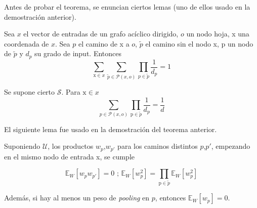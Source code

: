 Antes de probar el teorema, se enuncian ciertos lemas (uno de ellos usado en la demostración anterior).

\begin{lema} \label{lem26}
Sea $x$ el vector de entradas de un grafo acíclico dirigido, $o$ un nodo hoja, x una coordenada de $x$. Sea $p$ el camino de x a $o$, $\tilde{p}$ el camino sin el nodo x, p un nodo de $\tilde{p}$ y $d_p$ su grado de input. Entonces
$$\sum_{\text{x}\in x} \sum_{\tilde{p} \in \mathcal{P}(x,o)}\prod_{p \in \tilde{p}} \frac{1}{d_p}=1$$
\end{lema}

\begin{lema} \label{lem27}
Se supone cierto $\mathcal{S}$. Para $\text{x}\in x$
$$\sum_{p \in \mathcal{P}(x,o)} \prod_{\text{p} \in \tilde{p}}\frac{1}{d_p}=\frac{1}{d}$$
\end{lema}

El siguiente lema fue usado en la demostración del teorema anterior.

\begin{lema} \label{lem28}
Suponiendo $\mathcal{U}$, los productos $w_p$,$w_{p'}$ para los caminos distintos $p$,$p'$, empezando en el mismo nodo de entrada x, se cumple

$$\mathbb{E}_W[w_pw_{p'}]=0 \text{ ; } \mathbb{E}_W[w_p^2]=\prod_{\text{p} \in \tilde{p}} \mathbb{E}_W[w_p^2]$$

Además, si hay al menos un peso de \textit{pooling} en $p$, entonces $\mathbb{E}_W[w_p]=0$.
\end{lema}

